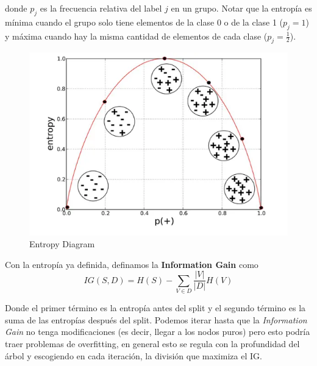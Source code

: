 donde $p_j$ es la frecuencia relativa del label $j$ en un grupo. Notar que la entropía es mínima cuando el grupo solo tiene elementos de la clase 0 o de la clase 1 ($p_j = 1$) y máxima cuando hay la misma cantidad de elementos de cada clase ($p_j = \frac{1}{2}$). 

\begin{figure}[H]
    \center
    \includegraphics[scale=0.3]{notebooks/ML/img/entropy_diagram.png}
    \caption{Entropy Diagram}
\end{figure}

Con la entropía ya definida, definamos la \textbf{Information Gain} como 
$$IG(S,D) = H(S) - \sum_{V \in D}\frac{|V|}{|D|}H(V)$$

Donde el primer término es la entropía antes del split y el segundo término es la suma de las entropías después del split. Podemos iterar hasta que la \textit{Information Gain} no tenga modificaciones (es decir, llegar a los nodos puros) pero esto podría traer problemas de overfitting, en general esto se regula con la profundidad del árbol y escogiendo en cada iteración, la división que maximiza el IG. 

